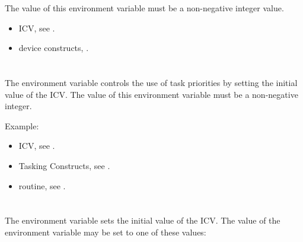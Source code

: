 The value of this environment variable must be a non-negative integer value.

\crossreferences
\begin{itemize}
\item {} ICV, see .

\item device constructs, .
\end{itemize}


\section{}
\label{sec:OMP_MAX_TASK_PRIORITY}

The  environment variable controls the use of task
priorities by setting the initial value of the  ICV. The
value of this environment variable must be a non-negative integer.

Example:
\begin{ompEnv}
\end{ompEnv}

\crossreferences
\begin{itemize}
\item {} ICV, see .
\item Tasking Constructs, see .
\item {} routine, see .
\end{itemize}




\section{}
\label{sec:OMP_TARGET_OFFLOAD}
%
The  environment variable sets the initial value of the  ICV.
The value of the  environment variable may be set to one of these
values:


